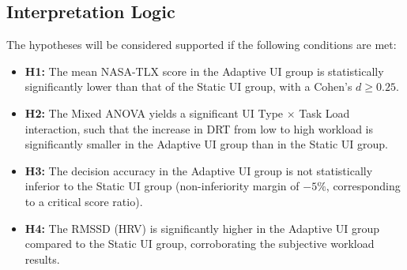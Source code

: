 \subsection{Interpretation Logic}
The hypotheses will be considered supported if the following conditions are met:
\begin{itemize}
  \item \textbf{H1:} The mean NASA-TLX score in the Adaptive UI group is statistically significantly lower than that of the Static UI group, with a Cohen's $d \ge 0.25$.
  \item \textbf{H2:} The Mixed ANOVA yields a significant UI Type $\times$ Task Load interaction, such that the increase in DRT from low to high workload is significantly smaller in the Adaptive UI group than in the Static UI group.
  \item \textbf{H3:} The decision accuracy in the Adaptive UI group is not statistically inferior to the Static UI group (non-inferiority margin of $-5\%$, corresponding to a critical score ratio).
  \item \textbf{H4:} The RMSSD (HRV) is significantly higher in the Adaptive UI group compared to the Static UI group, corroborating the subjective workload results.
\end{itemize}
